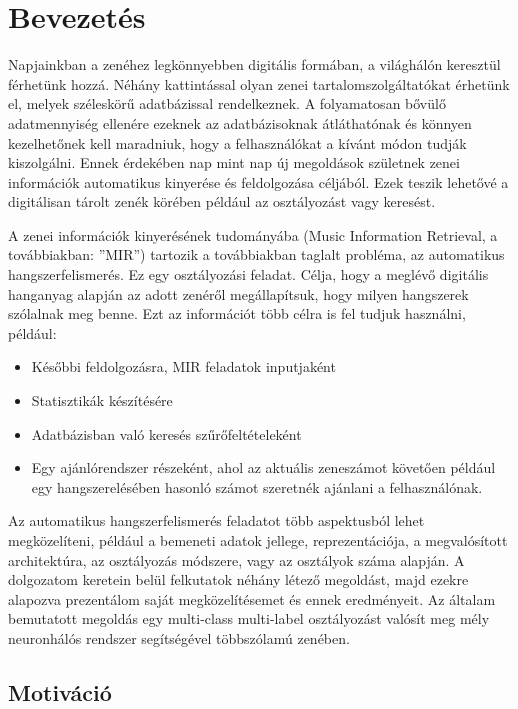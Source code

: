\chapter{Bevezetés} %
\label{ch:intro}

Napjainkban a zenéhez legkönnyebben digitális formában, a világhálón keresztül férhetünk hozzá. Néhány kattintással olyan zenei tartalomszolgáltatókat érhetünk el, melyek széleskörű adatbázissal rendelkeznek. A folyamatosan bővülő adatmennyiség ellenére ezeknek az adatbázisoknak átláthatónak és könnyen kezelhetőnek kell maradniuk, hogy a felhasználókat a kívánt módon tudják kiszolgálni. Ennek érdekében nap mint nap új  megoldások születnek zenei információk automatikus kinyerése és feldolgozása céljából. Ezek teszik lehetővé a digitálisan tárolt zenék körében például az osztályozást vagy keresést.

A zenei információk kinyerésének tudományába (Music Information Retrieval, a továbbiakban: ''MIR'') tartozik a továbbiakban taglalt probléma, az automatikus hangszerfelismerés. Ez egy osztályozási feladat. Célja, hogy a meglévő digitális hanganyag alapján az adott zenéről megállapítsuk, hogy milyen hangszerek szólalnak meg benne. Ezt az információt több célra is fel tudjuk használni, például:
\begin{itemize}
 \item Későbbi feldolgozásra, MIR feladatok inputjaként
 \item Statisztikák készítésére
 \item Adatbázisban való keresés szűrőfeltételeként
 \item Egy ajánlórendszer részeként, ahol az aktuális zeneszámot követően például egy hangszerelésében hasonló számot szeretnék ajánlani a felhasználónak.
\end{itemize}

Az automatikus hangszerfelismerés feladatot több aspektusból lehet megközelíteni, például a bemeneti adatok jellege, reprezentációja, a megvalósított architektúra, az osztályozás módszere, vagy az osztályok száma alapján. A dolgozatom keretein belül felkutatok néhány létező megoldást, majd ezekre alapozva prezentálom saját megközelítésemet és ennek eredményeit. Az általam bemutatott megoldás egy multi-class multi-label osztályozást valósít meg mély neuronhálós rendszer segítségével többszólamú zenében.

\section{Motiváció}


